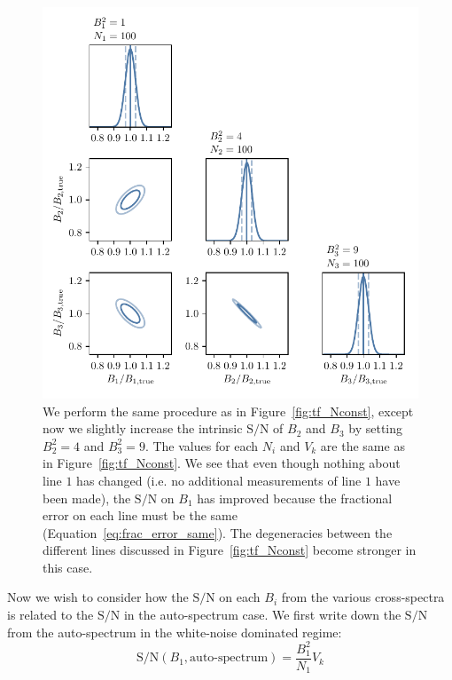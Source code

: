 \documentclass{aastex62}
\newcommand{\beq}{\begin{equation}}
\newcommand{\eeq}{\end{equation}}
\newcommand{\SN}{\ensuremath{\text{S}/\text{N}}}
\begin{document}
\begin{figure}[h!]
\begin{center}
\includegraphics{fig/corner_Nconstant_Bhigher.pdf}
\end{center}
\caption{We perform the same procedure as in Figure~\ref{fig:tf_Nconst}, except
now we slightly increase the intrinsic \SN{} of $B_2$ and $B_3$ by setting
$B_2^2 = 4$ and $B_3^2 = 9$. The values for each $N_i$ and $V_k$ are the same
as in Figure~\ref{fig:tf_Nconst}. We see that even though nothing about line
$1$ has changed (i.e. no additional measurements of line $1$ have been made),
the \SN{} on $B_1$ has improved because the fractional error on each line must
be the same (Equation~\ref{eq:frac_error_same}). The degeneracies between the
different lines discussed in Figure~\ref{fig:tf_Nconst} become stronger in
this case.}
\label{fig:tf_Nconst_Bhigher}
\end{figure}

Now we wish to consider how the \SN{} on each $B_i$ from the various
cross-spectra is related to the \SN{} in the auto-spectrum case. We first
write down the \SN{} from the auto-spectrum in the white-noise dominated
regime:
\beq \label{eq:autops_sn_wn}
\SN(B_1, \text{auto-spectrum}) = \frac{B_1^2}{N_1} V_k
\eeq
\end{document}
